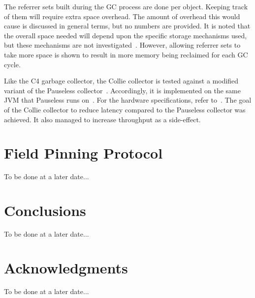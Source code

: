 \documentclass{sig-alternate}
\begin{document}
The referrer sets built during the GC process are done per object. Keeping track of them
will require extra space overhead. The amount of overhead this would cause is discussed in
general terms, but no numbers are provided. It is noted that the overall space needed will 
depend upon the specific storage mechanisms used, but these mechanisms are not 
investigated~\cite{Iyengar:Collie}. However, allowing referrer sets to take
more space is shown to result in more memory being reclaimed for each GC cycle.

Like the C4 garbage collector, the Collie collector is tested against a modified
variant of the Pauseless collector~\cite{Iyengar:Collie}. Accordingly, it is 
implemented on the same JVM that Pauseless runs on~\cite{Click:Pauseless}. For the 
hardware specifications, refer to~\cite{Iyengar:Collie}. The goal of the Collie 
collector to reduce latency compared to the Pauseless collector was achieved. 
It also managed to increase throughput as a side-effect. 



\section{Field Pinning Protocol}
\label{sec:fpp}

To be done at a later date...


\section{Conclusions}
\label{sec:conclusions}

To be done at a later date...


\section*{Acknowledgments}
\label{sec:acknowledgments}

To be done at a later date...



  
\end{document}
